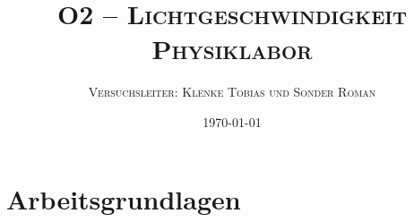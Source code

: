 \documentclass[10pt,a4paper,oneside]{article}
\title{
	\textsc{\huge{O2 -- Lichtgeschwindigkeit}}\\[4ex]
	\textsc{Physiklabor}
}
\author{\textsc{Versuchsleiter: Klenke Tobias und Sonder Roman}}
\date{\today}
\begin{document}
\maketitle
\noindent %
\clearpage
\color{black}

\setcounter{page}{1}
%

%

\tableofcontents
\clearpage


\setcounter{page}{1}
\section{Arbeitsgrundlagen}\label{sec:arbeitsgrundlagen}

\clearpage
\end{document}
